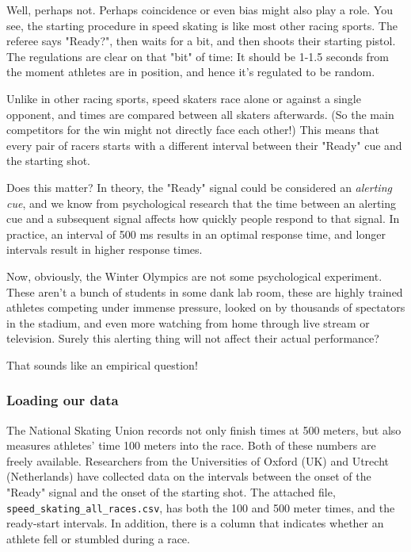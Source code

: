 \documentclass[11pt]{article}
\begin{document}
Well, perhaps not. Perhaps coincidence or even bias might also play a
role. You see, the starting procedure in speed skating is like most
other racing sports. The referee says "Ready?", then waits for a bit,
and then shoots their starting pistol. The regulations are clear on that
"bit" of time: It should be 1-1.5 seconds from the moment athletes are
in position, and hence it's regulated to be random.

Unlike in other racing sports, speed skaters race alone or against a
single opponent, and times are compared between all skaters afterwards.
(So the main competitors for the win might not directly face each
other!) This means that every pair of racers starts with a different
interval between their "Ready" cue and the starting shot.

Does this matter? In theory, the "Ready" signal could be considered an
\emph{alerting cue}, and we know from psychological research that the
time between an alerting cue and a subsequent signal affects how quickly
people respond to that signal. In practice, an interval of 500 ms
results in an optimal response time, and longer intervals result in
higher response times.

Now, obviously, the Winter Olympics are not some psychological
experiment. These aren't a bunch of students in some dank lab room,
these are highly trained athletes competing under immense pressure,
looked on by thousands of spectators in the stadium, and even more
watching from home through live stream or television. Surely this
alerting thing will not affect their actual performance?

That sounds like an empirical question!

\subsubsection{Loading our data}\label{loading-our-data}

The National Skating Union records not only finish times at 500 meters,
but also measures athletes' time 100 meters into the race. Both of these
numbers are freely available. Researchers from the Universities of
Oxford (UK) and Utrecht (Netherlands) have collected data on the
intervals between the onset of the "Ready" signal and the onset of the
starting shot. The attached file,
\texttt{speed\_skating\_all\_races.csv}, has both the 100 and 500 meter
times, and the ready-start intervals. In addition, there is a column
that indicates whether an athlete fell or stumbled during a race.
\end{document}

